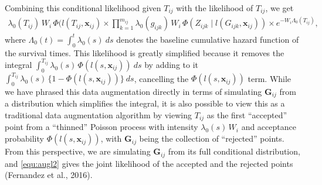 \documentclass[11pt]{article}
\begin{document}
  Combining this conditional likelihood given $T_{ij}$ with the likelihood of $T_{ij}$, we get
   \begin{align}
      \lambda_0(T_{ij}) 
        \, W_i 
        \, \Phi(l(T_{ij}, \mathbf{x}_{ij})
      \times \prod_{k=1}^{m_{ij}}
        \lambda_0(g_{ijk})
        \, W_i
        \, \Phi(Z_{ijk} \mid l(G_{ijk}, \mathbf x_{ij}))
      \times 
      e^{-W_i \Lambda_0(T_{ij})},
      \label{equ:augl2}
    \end{align} 
    where $\Lambda_0(t) = \int_0^t \lambda_0(s) \ ds$ denotes the baseline cumulative hazard function of the survival times. This likelihood is greatly simplified because it removes the integral $\int_0^{T_{ij}} \lambda_0(s) \, \Phi(l(s, \mathbf x_{ij})) \ ds$ by adding to it $\int_0^{T_{ij}} \lambda_0(s) \, \{1 - \Phi(l(s, \mathbf x_{ij}))\} \ ds$, cancelling the $\Phi(l(s, \mathbf x_{ij}))$ term. While we have phrased this data augmentation directly in terms of simulating $\mathbf G_{ij}$ from a distribution which simplifies the integral, it is also possible to view this as a traditional data augmentation algorithm by viewing $T_{ij}$ as the first ``accepted'' point from a ``thinned'' Poisson process with intensity $\lambda_0(s) \, W_i$ and acceptance probability $\Phi(l(s, \mathbf x_{ij}))$, with $\mathbf G_{ij}$ being the collection of ``rejected'' points. From this perspective, we are simulating $\mathbf G_{ij}$ from its full conditional distribution, and \eqref{equ:augl2} gives the joint likelihood of the accepted and the rejected points (Fernandez et al., 2016).
\end{document}
